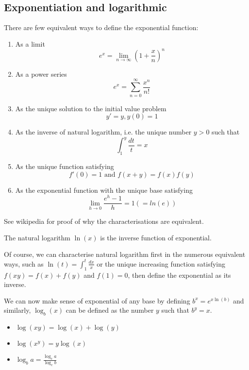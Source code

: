 \documentclass[11pt]{article}
\begin{document}
\subsection{Exponentiation and logarithmic}
\begin{definition}
  There are few equivalent ways to define the exponential function:
\begin{enumerate}
  \item As a limit \[e^x=\lim_{n\to\infty}\left(1+\frac{x}{n}\right)^n\]
  \item As a power series \[e^x=\sum_{n=0}^\infty\frac{x^n}{n!}\]
  \item As the unique solution to the initial value problem \[y'=y,y(0)=1\]
  \item As the inverse of natural logarithm, i.e. the unique number \(y>0\) such that \[\int_1^y \frac{dt}{t} =x\]
  \item As the unique function satisfying \[f'(0)=1 \text{ and } f(x+y)=f(x)f(y)\]
  \item As the exponential function with the unique base satisfying \[\lim_{h\to 0}\frac{e^h-1}{h}=1 (=ln(e))\]
\end{enumerate}
\end{definition}
See wikipedia for proof of why the characterisations are equivalent.

\begin{definition}
  The natural logarithm \(\ln(x)\) is the inverse function of exponential.
\end{definition}
Of course, we can characterise natural logarithm first in the numerous equivalent ways, such as \(\ln(t)=\int_1^t\frac{dx}{x}\) or the unique increasing function satisfying \(f(xy)=f(x)+f(y)\) and \(f(1)=0\), then define the exponential as its inverse.

\vspace{5pt}We can now make sense of exponential of any base by defining \(b^x=e^{x\ln(b)}\) and similarly, \(\log_b(x)\) can be defined as the number \(y\) such that \(b^y=x\).

\begin{proposition}
  \begin{itemize}
    \item \(\log(xy)=\log(x)+\log(y)\)
    \item \(\log(x^y)=y\log(x)\)
    \item \(\log_ba=\frac{\log_ca}{\log_cb}\)
  \end{itemize}
\end{proposition}
\end{document}
